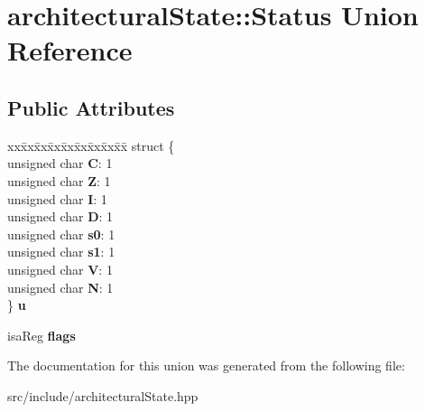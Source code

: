 \hypertarget{unionarchitecturalState_1_1Status}{}\section{architectural\+State\+::Status Union Reference}
\label{unionarchitecturalState_1_1Status}
\subsection*{Public Attributes}
\begin{DoxyCompactItemize}
\item 
\mbox{\label{unionarchitecturalState_1_1Status_ab79e85f05887d887817d3e63bc3269c9}} 
\begin{tabbing}
xx\=xx\=xx\=xx\=xx\=xx\=xx\=xx\=xx\=\kill
struct \{\\
\>unsigned char {\bfseries C}: 1\\
\>unsigned char {\bfseries Z}: 1\\
\>unsigned char {\bfseries I}: 1\\
\>unsigned char {\bfseries D}: 1\\
\>unsigned char {\bfseries s0}: 1\\
\>unsigned char {\bfseries s1}: 1\\
\>unsigned char {\bfseries V}: 1\\
\>unsigned char {\bfseries N}: 1\\
\} {\bfseries u}\\

\end{tabbing}\item 
\mbox{\label{unionarchitecturalState_1_1Status_ad495cf0438df8274190284e2ea0007f9}} 
isa\+Reg {\bfseries flags}
\end{DoxyCompactItemize}


The documentation for this union was generated from the following file\+:\begin{DoxyCompactItemize}
\item 
src/include/architectural\+State.\+hpp\end{DoxyCompactItemize}
